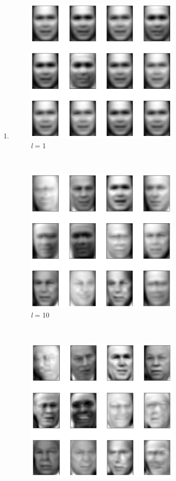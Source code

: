 \documentclass[11pt]{article}
\newcommand{\solution}[1]{{{\color{blue}{\bf Solution:} {#1}}}}
\begin{document}
\begin{enumerate}
\newpage
\item
\solution{
\begin{figure}[!htbp]
    \centering
    \includegraphics[width=3in]{c1.png}
    \caption{\textit{l} = 1} 
\end{figure} \\
\begin{figure}[!htbp]
    \centering
    \includegraphics[width=3in]{c10.png}
    \caption{\textit{l} = 10} 
\end{figure} \\
\begin{figure}[!htbp]
    \centering
    \includegraphics[width=3in]{c50.png}

\end{figure}}
\end{enumerate}
\end{document}
